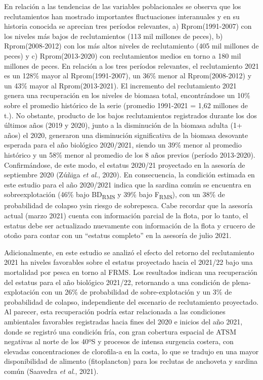 \documentclass[
  spanish,
]{article}
\begin{document}
En relación a las tendencias de las variables poblacionales se observa
que los reclutamientos han mostrado importantes fluctuaciones
interanuales y en su historia conocida se aprecian tres períodos
relevantes, a) Rprom(1991-2007) con los niveles más bajos de
reclutamientos (113 mil millones de peces), b) Rprom(2008-2012) con los
más altos niveles de reclutamiento (405 mil millones de peces) y c)
Rprom(2013-2020) con reclutamientos medios en torno a 180 mil millones
de peces. En relación a los tres períodos relevantes, el reclutamiento
2021 es un 128\% mayor al Rprom(1991-2007), un 36\% menor al
Rprom(2008-2012) y un 43\% mayor al Rprom(2013-2021). El incremento del
reclutamiento 2021 genera una recuperación en los niveles de biomasa
total, encontrándose un 10\% sobre el promedio histórico de la serie
(promedio 1991-2021 = 1,62 millones de t.). No obstante, producto de los
bajos reclutamientos registrados durante los dos últimos años (2019 y
2020), junto a la disminución de la biomasa adulta (1+ años) el 2020,
generaron una disminución significativa de la biomasa desovante esperada
para el año biológico 2020/2021, siendo un 39\% menor al promedio
histórico y un 58\% menor al promedio de los 8 años previos (período
2013-2020). Confirmándose, de este modo, el estatus 2020/21 proyectado
en la asesoría de septiembre 2020 (Zúñiga \emph{et al}., 2020). En
consecuencia, la condición estimada en este estudio para el año
2020/2021 indica que la sardina común se encuentra en sobreexplotación
(46\% bajo BD\textsubscript{RMS} y 39\% bajo F\textsubscript{RMS}), con
un 38\% de probabilidad de colapso ysin riesgo de sobrepesca. Cabe
recordar que la asesoría actual (marzo 2021) cuenta con información
parcial de la flota, por lo tanto, el estatus debe ser actualizado
nuevamente con información de la flota y crucero de otoño para contar
con un ``estatus completo'' en la asesoría de julio 2021.

Adicionalmente, en este estudio se analizó el efecto del retorno del
reclutamiento 2021 ha niveles favorables sobre el estatus proyectado
hacia el 2021/22 bajo una mortalidad por pesca en torno al FRMS. Los
resultados indican una recuperación del estatus para el año biológico
2021/22, retornando a una condición de plena-explotación con un 26\% de
probabilidad de sobre-explotación y un 3\% de probabilidad de colapso,
independiente del escenario de reclutamiento proyectado. Al parecer,
esta recuperación podría estar relacionada a las condiciones ambientales
favorables registradas hacia fines del 2020 e inicios del año 2021,
donde se registró una condición fría, con gran cobertura espacial de
ATSM negativas al norte de los 40ºS y procesos de intensa surgencia
costera, con elevadas concentraciones de clorofila-a en la costa, lo que
se tradujo en una mayor disponibilidad de alimento (fitoplancton) para
los reclutas de anchoveta y sardina común (Saavedra \emph{et al}.,
2021).
\end{document}
